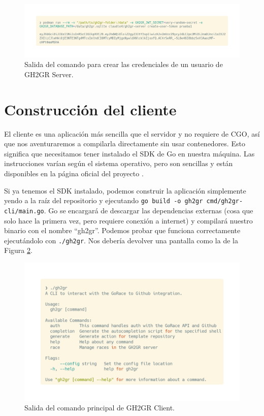 \begin{figure}
    \centering
    \includegraphics[width=0.75\linewidth]{images/create-user-token.png}
    \caption{Salida del comando para crear las credenciales de un usuario de GH2GR Server.}
    \label{fig:create-user-token}
\end{figure}

\section{Construcción del cliente}
El cliente es una aplicación más sencilla que el servidor y no requiere de CGO, así que nos aventuraremos a compilarla directamente sin usar contenedores. Esto significa que necesitamos tener instalado el SDK de Go en nuestra máquina. Las instrucciones varían según el sistema operativo, pero son sencillas y están disponibles en la página oficial del proyecto \cite{installGo}.

Si ya tenemos el SDK instalado, podemos construir la aplicación simplemente yendo a la raíz del repositorio y ejecutando \texttt{go build -o gh2gr cmd/gh2gr-cli/main.go}. Go se encargará de descargar las dependencias externas (cosa que solo hace la primera vez, pero requiere conexión a internet) y compilará nuestro binario con el nombre ``gh2gr''. Podemos probar que funciona correctamente ejecutándolo con \texttt{./gh2gr}. Nos debería devolver una pantalla como la de la Figura \ref{fig:client-root-help}.

\begin{figure}
    \centering
    \includegraphics[width=0.75\linewidth]{images/client-root-help.png}
    \caption{Salida del comando principal de GH2GR Client.}
    \label{fig:client-root-help}
\end{figure}

